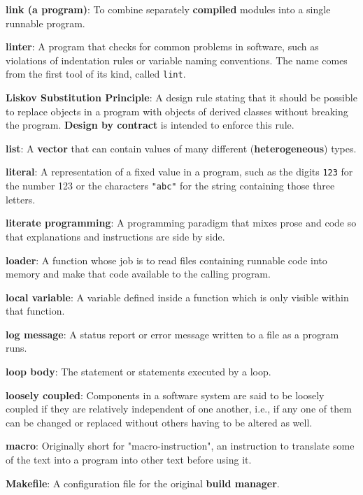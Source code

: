 \documentclass[krantzl]{krantz}
\newcommand{\glosskey}[1]{\textbf{#1}}
\begin{document}
\noindent \textbf{\glosskey{link (a program)}}: 
To combine separately \glosskey{compiled} modules into a single runnable program.


\noindent \textbf{\glosskey{linter}}: 
A program that checks for common problems in software, such as violations of indentation rules or variable naming conventions. The name comes from the first tool of its kind, called \texttt{lint}.


\noindent \textbf{\glosskey{Liskov Substitution Principle}}: 
A design rule stating that it should be possible to replace objects in a program with objects of derived classes without breaking the program. \glosskey{Design by contract} is intended to enforce this rule.


\noindent \textbf{\glosskey{list}}: 
A \glosskey{vector} that can contain values of many different (\glosskey{heterogeneous}) types.


\noindent \textbf{\glosskey{literal}}: 
A representation of a fixed value in a program, such as the digits \texttt{123} for the number 123 or the characters \texttt{"abc"} for the string containing those three letters.


\noindent \textbf{\glosskey{literate programming}}: 
A programming paradigm that mixes prose and code so that explanations and instructions are side by side.


\noindent \textbf{\glosskey{loader}}: 
A function whose job is to read files containing runnable code into memory and make that code available to the calling program.


\noindent \textbf{\glosskey{local variable}}: 
A variable defined inside a function which is only visible within that function.


\noindent \textbf{\glosskey{log message}}: 
A status report or error message written to a file as a program runs.


\noindent \textbf{\glosskey{loop body}}: 
The statement or statements executed by a loop.


\noindent \textbf{\glosskey{loosely coupled}}: 
Components in a software system are said to be loosely coupled if they are relatively independent of one another, i.e., if any one of them can be changed or replaced without others having to be altered as well.


\noindent \textbf{\glosskey{macro}}: 
Originally short for "macro-instruction", an instruction to translate some of the text into a program into other text before using it.


\noindent \textbf{\glosskey{Makefile}}: 
A configuration file for the original \glosskey{build manager}.
\end{document}
